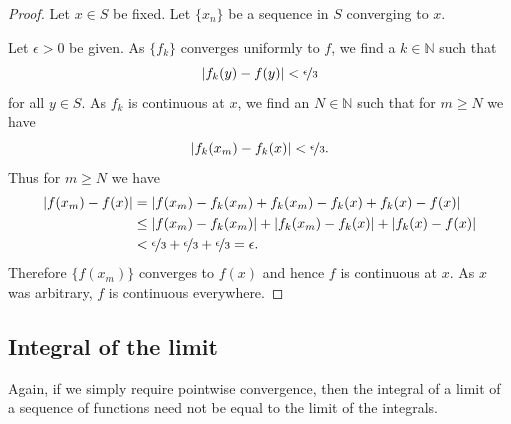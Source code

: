 \documentclass[12pt]{book}
\newcommand{\abs}[1]{\left\lvert {#1} \right\rvert}
\newcommand{\N}{{\mathbb{N}}}
\theoremstyle{plain}
\theoremstyle{remark}
\theoremstyle{definition}
\theoremstyle{exercise}
\theoremstyle{example}
\begin{document}
\begin{proof}
Let $x \in S$ be fixed.  Let $\{ x_n \}$ be a sequence in $S$
converging to $x$.

Let $\epsilon > 0$ be given.
As $\{ f_k \}$ converges uniformly to $f$, we find a $k \in \N$ such that
\begin{equation*}
\abs{f_k(y)-f(y)} < \nicefrac{\epsilon}{3}
\end{equation*}
for all $y \in S$.  As $f_k$ is continuous at $x$,
we find an $N \in \N$ such that for $m \geq N$
we have 
\begin{equation*}
\abs{f_k(x_m)-f_k(x)} < \nicefrac{\epsilon}{3} .
\end{equation*}
Thus for
$m \geq N$ we have
\begin{equation*}
\begin{split}
\abs{f(x_m)-f(x)}
& =
\abs{f(x_m)-f_k(x_m)+f_k(x_m)-f_k(x)+f_k(x)-f(x)}
\\
& \leq
\abs{f(x_m)-f_k(x_m)}+
\abs{f_k(x_m)-f_k(x)}+
\abs{f_k(x)-f(x)}
\\
& <
\nicefrac{\epsilon}{3} +
\nicefrac{\epsilon}{3} +
\nicefrac{\epsilon}{3} = \epsilon .
\end{split}
\end{equation*}
Therefore $\{ f(x_m) \}$ converges to $f(x)$ and hence $f$ is continuous at
$x$.  As $x$ was arbitrary, $f$ is continuous everywhere.
\end{proof}

\subsection{Integral of the limit}

Again, if we simply require pointwise convergence, then the integral
of a limit of a sequence of functions need not be equal to the limit
of the integrals.
\end{document}
